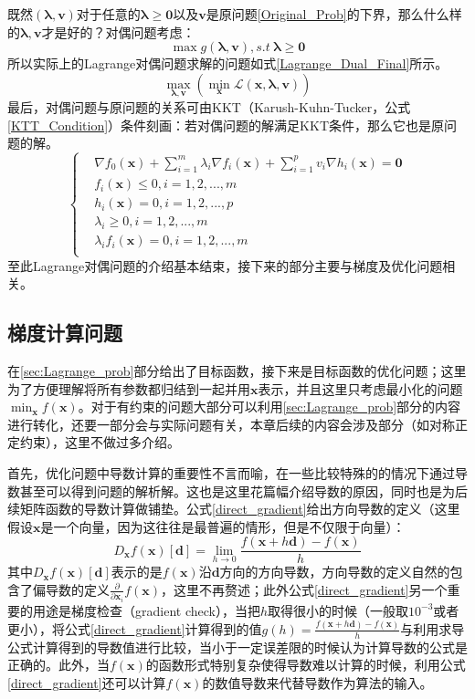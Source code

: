 既然$(\bm{\lambda},\bm{v})$对于任意的$\bm{\lambda} \geq \bm{0}$以及$\bm{v}$是原问题\ref{Original_Prob}的下界，那么什么样的$\bm{\lambda},\bm{v}$才是好的？对偶问题考虑：
\begin{equation}
\label{Dual_Prob}
\max g(\bm{\lambda},\bm{v}),s.t~\bm{\lambda} \geq \bm{0}
\end{equation}
所以实际上的Lagrange对偶问题求解的问题如式\ref{Lagrange_Dual_Final}所示。
\begin{equation}
\label{Lagrange_Dual_Final}
\max_{\bm{\lambda},\bm{v}}\left(\min_{\bm{x}}\mathcal{L}(\bm{x},\bm{\lambda},\bm{v})\right)
\end{equation}
最后，对偶问题与原问题的关系可由KKT（Karush-Kuhn-Tucker，公式\ref{KTT_Condition}）条件刻画：若对偶问题的解满足KKT条件，那么它也是原问题的解。
\begin{equation}
\label{KTT_Condition}
\left\{
\begin{aligned}
&\nabla f_0(\bm{x})+\sum_{i=1}^{m}\lambda_i \nabla f_i(\bm{x})+\sum_{i=1}^{p}v_i \nabla h_i(\bm{x})=\bm{0}\\
&f_i(\bm{x}) \leq 0,i=1,2,...,m\\
&h_i(\bm{x}) =0,i=1,2,...,p\\
&\lambda_i \geq 0,i=1,2,...,m\\
&\lambda_i f_i(\bm{x})=0, i=1,2,...,m\\
\end{aligned}
\right.
\end{equation}
至此Lagrange对偶问题的介绍基本结束，接下来的部分主要与梯度及优化问题相关。
\subsection{梯度计算问题}
\label{sec:gradinet}
在\ref{sec:Lagrange_prob}部分给出了目标函数，接下来是目标函数的优化问题；这里为了方便理解将所有参数都归结到一起并用$\bm{x}$表示，并且这里只考虑最小化的问题$\min_{\bm{x}} f(\bm{x})$。对于有约束的问题大部分可以利用\ref{sec:Lagrange_prob}部分的内容进行转化，还要一部分会与实际问题有关，本章后续的内容会涉及部分（如对称正定约束），这里不做过多介绍。

首先，优化问题中导数计算的重要性不言而喻，在一些比较特殊的的情况下通过导数甚至可以得到问题的解析解。这也是这里花篇幅介绍导数的原因，同时也是为后续矩阵函数的导数计算做铺垫。公式\ref{direct_gradient}给出方向导数的定义（这里假设$\bm{x}$是一个向量，因为这往往是最普遍的情形，但是不仅限于向量）：
\begin{equation}
\label{direct_gradient}
D_{\bm{x}}f(\bm{x})[\bm{d}]=\lim_{h\rightarrow 0}\frac{f(\bm{x}+h\bm{d})-f(\bm{x})}{h}
\end{equation}
其中$D_{\bm{x}}f(\bm{x})[\bm{d}]$表示的是$f(\bm{x})$沿$\bm{d}$方向的方向导数，方向导数的定义自然的包含了偏导数的定义$\frac{\partial}{\partial \bm{x}_{i}}f(\bm{x})$，这里不再赘述；此外公式\ref{direct_gradient}另一个重要的用途是梯度检查（gradient check），当把$h$取得很小的时候（一般取$10^{-3}$或者更小），将公式\ref{direct_gradient}计算得到的值$g(h)=\frac{f(\bm{x}+h\bm{d})-f(\bm{x})}{h}$与利用求导公式计算得到的导数值进行比较，当小于一定误差限的时候认为计算导数的公式是正确的。此外，当$f(\bm{x})$的函数形式特别复杂使得导数难以计算的时候，利用公式\ref{direct_gradient}还可以计算$f(\bm{x})$的数值导数来代替导数作为算法的输入。

